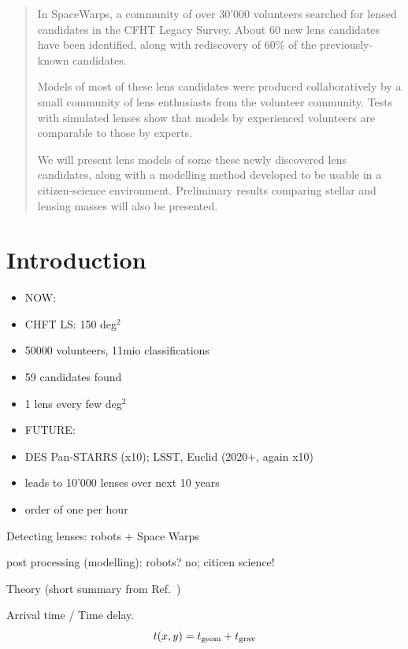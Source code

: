 \documentclass{ws-procs975x65}
\newcommand{\sw}{Space Warps\xspace}
\newcommand{\icite}[1]{Ref.~\refcite{#1}} %
\begin{document}
\begin{abstract}
In SpaceWarps, a community of over 30'000 volunteers searched for lensed candidates
in the CFHT Legacy Survey. About 60 new lens candidates have been identified, along
with rediscovery of 60\% of the previously-known candidates.

Models of most of these lens candidates were produced collaboratively by a small
community of lens enthusiasts from the volunteer community. Tests with simulated
lenses show that models by experienced volunteers are comparable to those by
experts.

We will present lens models of some these newly discovered lens candidates, along
with a modelling method developed to be usable in a citizen-science environment.
Preliminary results comparing stellar and lensing masses will also be
presented.
\end{abstract}




\bodymatter



\section{Introduction}

\begin{itemize}
  \item NOW:
  \item CHFT LS: 150 deg$^2$
  \item 50000 volunteers, 11mio classifications
  \item 59 candidates found
  \item 1 lens every few deg$^2 $
  \item FUTURE:
  \item DES Pan-STARRS (x10); LSST, Euclid (2020+, again x10)
  \item leads to 10'000 lenses over next 10 years
  \item order of one per hour
\end{itemize}

Detecting lenses: robots + \sw

post processing (modelling): robots? no; citicen science!

Theory (short summary from \icite{Kueng2015})

Arrival time / Time delay.
\begin{equation}  \label{eq:tarriv}
t(x,y) = t_{\rm geom} + t_{\rm grav}
\end{equation}
\end{document}
